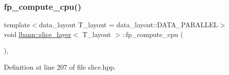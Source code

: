 \subsubsection{\texorpdfstring{fp\+\_\+compute\+\_\+cpu()}{fp\_compute\_cpu()}}
{\footnotesize\ttfamily template$<$data\+\_\+layout T\+\_\+layout = data\+\_\+layout\+::\+D\+A\+T\+A\+\_\+\+P\+A\+R\+A\+L\+L\+EL$>$ \\
void \hyperlink{classlbann_1_1slice__layer}{lbann\+::slice\+\_\+layer}$<$ T\+\_\+layout $>$\+::fp\+\_\+compute\+\_\+cpu (\begin{DoxyParamCaption}{ }\end{DoxyParamCaption})\hspace{0.3cm}{\ttfamily [inline]}, {\ttfamily [protected]}}



Definition at line 207 of file slice.\+hpp.


